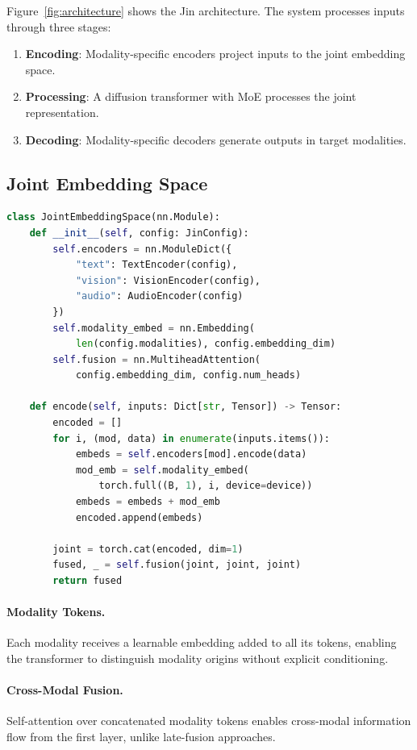 \documentclass[11pt,twocolumn]{article}
\begin{document}
Figure~\ref{fig:architecture} shows the Jin architecture. The system processes inputs through three stages:

\begin{enumerate}
    \item \textbf{Encoding}: Modality-specific encoders project inputs to the joint embedding space.
    \item \textbf{Processing}: A diffusion transformer with MoE processes the joint representation.
    \item \textbf{Decoding}: Modality-specific decoders generate outputs in target modalities.
\end{enumerate}

\subsection{Joint Embedding Space}

\begin{lstlisting}[language=Python]
class JointEmbeddingSpace(nn.Module):
    def __init__(self, config: JinConfig):
        self.encoders = nn.ModuleDict({
            "text": TextEncoder(config),
            "vision": VisionEncoder(config),
            "audio": AudioEncoder(config)
        })
        self.modality_embed = nn.Embedding(
            len(config.modalities), config.embedding_dim)
        self.fusion = nn.MultiheadAttention(
            config.embedding_dim, config.num_heads)

    def encode(self, inputs: Dict[str, Tensor]) -> Tensor:
        encoded = []
        for i, (mod, data) in enumerate(inputs.items()):
            embeds = self.encoders[mod].encode(data)
            mod_emb = self.modality_embed(
                torch.full((B, 1), i, device=device))
            embeds = embeds + mod_emb
            encoded.append(embeds)

        joint = torch.cat(encoded, dim=1)
        fused, _ = self.fusion(joint, joint, joint)
        return fused
\end{lstlisting}

\paragraph{Modality Tokens.} Each modality receives a learnable embedding added to all its tokens, enabling the transformer to distinguish modality origins without explicit conditioning.

\paragraph{Cross-Modal Fusion.} Self-attention over concatenated modality tokens enables cross-modal information flow from the first layer, unlike late-fusion approaches.
\end{document}
